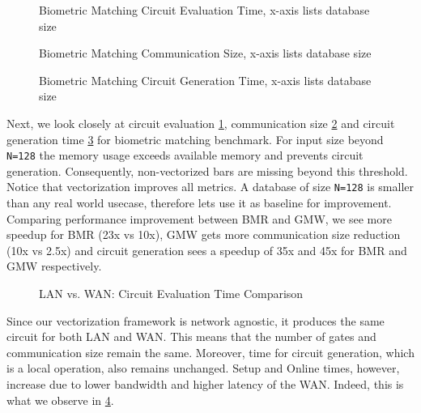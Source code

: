 \begin{figure}[htbp]
\centering
\resizebox{3.6in}{!}{}
\caption{Biometric Matching Circuit Evaluation Time, x-axis lists database size}
\label{fig:graph_biometric_eval_time}
\end{figure}

\begin{figure}[htbp]
\centering
\resizebox{3.6in}{!}{}
\caption{Biometric Matching Communication Size, x-axis lists database size}
\label{fig:graph_biometic_comm_size}
\end{figure}

\begin{figure}[htbp]
\centering
\resizebox{3.6in}{!}{}
\caption{Biometric Matching Circuit Generation Time, x-axis lists database size}
\label{fig:graph_biometic_circ_gen_time}
\end{figure}

Next, we look closely at circuit evaluation \cref{fig:graph_biometric_eval_time}, communication size \cref{fig:graph_biometic_comm_size} and circuit generation time \cref{fig:graph_biometic_circ_gen_time} for biometric matching benchmark. For input size beyond {\tt N=128} the memory usage exceeds available memory and prevents circuit generation. Consequently, non-vectorized bars are missing beyond this threshold. Notice that vectorization improves all metrics. A database of size {\tt N=128} is smaller than any real world usecase, therefore lets use it as baseline for improvement. Comparing performance improvement between BMR and GMW, we see more speedup for BMR (23x vs 10x), GMW gets more communication size reduction (10x vs 2.5x) and circuit generation sees a speedup of 35x and 45x for BMR and GMW respectively. 



\begin{figure}[htbp]
\centering
\resizebox{3.6in}{!}{}
\caption{LAN vs. WAN: Circuit Evaluation Time Comparison}
\label{fig:graph_comparison_eval_time}
\end{figure}

Since our vectorization framework is network agnostic, it produces the same circuit for both LAN and WAN. This means that the number of gates and communication size remain the same. Moreover, time for circuit generation, which is a local operation, also remains unchanged. Setup and Online times, however, increase due to lower bandwidth and higher latency of the WAN. Indeed, this is what we observe in \cref{fig:graph_comparison_eval_time}.

